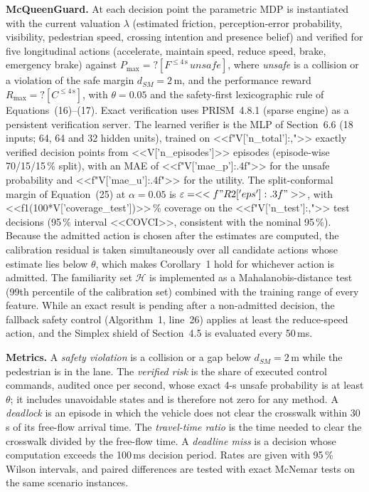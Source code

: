 \documentclass[11pt]{article}
\begin{document}
\textbf{McQueenGuard.} At each decision point the parametric MDP is instantiated with the current valuation $\lambda$ (estimated friction,
perception-error probability, visibility, pedestrian speed, crossing intention and presence belief) and verified for five longitudinal
actions (accelerate, maintain speed, reduce speed, brake, emergency brake) against $P_{\max}{=}?[F^{\le 4\,\mathrm{s}}\,\mathit{unsafe}]$,
where \emph{unsafe} is a collision or a violation of the safe margin $d_{SM}=2$\,m, and the performance reward
$R_{\max}{=}?[C^{\le 4\,\mathrm{s}}]$, with $\theta=0.05$ and the safety-first lexicographic rule of Equations~(16)--(17). Exact
verification uses PRISM~4.8.1 (sparse engine) as a persistent verification server. The learned verifier is the MLP of Section~6.6
(18 inputs; 64, 64 and 32 hidden units), trained on <<f"{V['n_total']:,}">> exactly verified decision points from <<V['n_episodes']>> episodes
(episode-wise 70/15/15\,\% split), with an MAE of <<f"{V['mae_p']:.4f}">> for the unsafe probability and <<f"{V['mae_u']:.4f}">> for the utility. The
split-conformal margin of Equation~(25) at $\alpha=0.05$ is $\varepsilon=<<f"{R2['eps']:.3f}">>$, with <<f1(100*V['coverage_test'])>>\,\% coverage on the
<<f"{V['n_test']:,}">> test decisions (95\,\% interval <<COVCI>>, consistent with the nominal 95\,\%). Because the admitted action is chosen after the estimates are computed, the calibration residual is taken simultaneously over
all candidate actions whose estimate lies below $\theta$, which makes Corollary~1 hold for whichever action is admitted. The familiarity set
$\mathcal{H}$ is implemented as a Mahalanobis-distance test (99th percentile of the calibration set) combined with the training range of every
feature. While an exact result is pending after a non-admitted decision, the fallback safety control (Algorithm~1, line~26) applies at
least the reduce-speed action, and the Simplex shield of Section~4.5 is evaluated every 50\,ms.

\textbf{Metrics.} A \emph{safety violation} is a collision or a gap below $d_{SM}=2$\,m while the pedestrian is in the lane. The \emph{verified
risk} is the share of executed control commands, audited once per second, whose exact 4-s unsafe probability is at least $\theta$; it
includes unavoidable states and is therefore not zero for any method. A \emph{deadlock} is an episode in which the vehicle does not clear the
crosswalk within 30\,s of its free-flow arrival time. The \emph{travel-time ratio} is the time needed to clear the crosswalk divided by the
free-flow time. A \emph{deadline miss} is a decision whose computation exceeds the 100\,ms decision period. Rates are given with 95\,\%
Wilson intervals, and paired differences are tested with exact McNemar tests on the same scenario instances.
\end{document}

